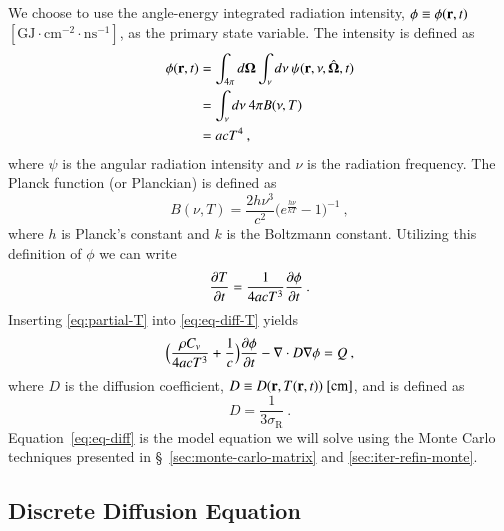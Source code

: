 \documentclass[preprint,12pt]{elsarticle}
\newcommand{\Cv}{\ensuremath{C_{v}}}
\newcommand{\ros}{\ensuremath{\sigma_{\scriptscriptstyle\mathrm{R}}}}
\newcommand{\bOmega}{\ensuremath{\mathbf{\Omega}}}
\begin{document}
We choose to use the angle-energy integrated radiation intensity,
$\phi\equiv\phi(\mathbf{r},t)$
$[\text{GJ}\cdot\text{cm}^{-2}\cdot\text{ns}^{-1}]$, as the primary state
variable.  The intensity is defined as
\begin{equation}
  \label{eq:lte-phi}
  \begin{split}
    \phi(\ve{r},t) &=
    \int_{4\pi}d\bOmega\int_{\nu}d\nu\:\psi(\ve{r},\nu,\hat{\bOmega},t)
    \\ &= \int_{\nu}d\nu\: 4\pi B(\nu,T) \\ &= acT^{4}\:,
  \end{split}
\end{equation}
where $\psi$ is the angular radiation intensity and $\nu$ is the radiation
frequency.  The Planck function (or Planckian) is defined as
\begin{equation}
  B(\nu,T)=\frac{2h\nu^{3}}{c^{2}}\bigl(e^{\frac{h\nu}{kT}} -
  1\bigr)^{-1}\:,
\end{equation}
where $h$ is Planck's constant and $k$ is the Boltzmann constant.  Utilizing
this definition of $\phi$ we can write
\begin{equation}
  \label{eq:partial-T}
  \frac{\partial T}{\partial t} = \frac{1}{4acT^{3}}\frac{\partial \phi}{\partial t}\:.
\end{equation}
Inserting \eqref{eq:partial-T} into \eqref{eq:eq-diff-T} yields
\begin{equation}
  \label{eq:eq-diff}
  \Bigl(\frac{\rho\Cv}{4acT^{3}} + \frac{1}{c}\Bigr)\pder{\phi}{t} -
  \nabla\cdot D\grad{\phi} = Q\:,
\end{equation}
where $D$ is the diffusion coefficient, $D\equiv
D(\mathbf{r},T(\mathbf{r},t))\ [\text{cm}]$, and is defined as
\begin{equation}
  D = \frac{1}{3\ros}\:.
\end{equation}
Equation~\eqref{eq:eq-diff} is the model equation we will solve using the
Monte Carlo techniques presented in \S~\ref{sec:monte-carlo-matrix} and
\ref{sec:iter-refin-monte}.

\subsection{Discrete Diffusion Equation}
\end{document}

